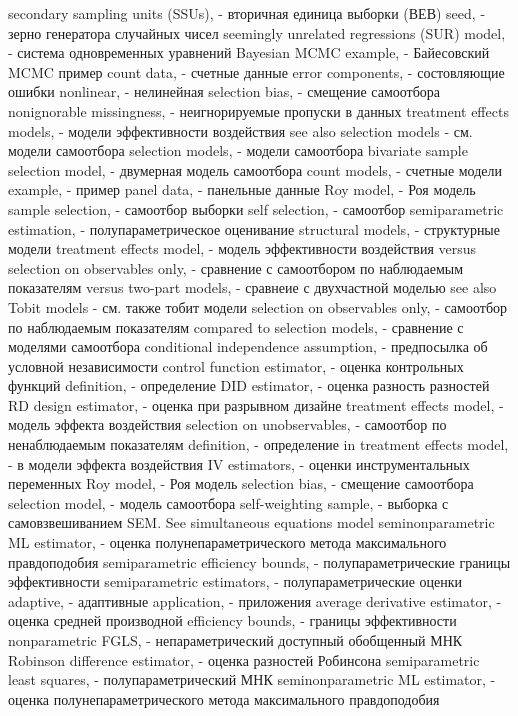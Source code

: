 secondary sampling units (SSUs), - вторичная единица выборки (ВЕВ)
seed, - зерно генератора случайных чисел
seemingly unrelated regressions (SUR) model, - система одновременных уравнений
Bayesian MCMC example, - Байесовский MCMC пример
count data, - счетные данные
error components, - состовляющие ошибки
nonlinear, - нелинейная
selection bias, - смещение самоотбора
nonignorable missingness, - неигнорируемые пропуски в данных
treatment effects models, - модели эффективности воздействия
see also selection models - см. модели самоотбора
selection models, - модели самоотбора
bivariate sample selection model, - двумерная модель самоотбора
count models, - счетные модели
example, - пример
panel data, - панельные данные
Roy model, - Роя модель
sample selection, - самоотбор выборки
self selection, - самоотбор
semiparametric estimation, - полупараметрическое оценивание
structural models, - структурные модели
treatment effects model, - модель эффективности воздействия
versus selection on observables only, - сравнение с самоотбором по наблюдаемым показателям
versus two-part models, - сравнеие с двухчастной моделью
see also Tobit models - см. также тобит модели
selection on observables only, - самоотбор по наблюдаемым показателям
compared to selection models, - сравнение с моделями самоотбора
conditional independence assumption, - предпосылка об условной независимости
control function estimator, - оценка контрольных функций
definition, - определение
DID estimator, - оценка разность разностей
RD design estimator, - оценка при разрывном дизайне
treatment effects model, - модель эффекта воздействия
selection on unobservables, - самоотбор по ненаблюдаемым показателям
definition, - определение
in treatment effects model, - в модели эффекта воздействия
IV estimators, - оценки инструментальных переменных
Roy model, - Роя модель
selection bias, - смещение самоотбора
selection model, - модель самоотбора
self-weighting sample, - выборка с самовзвешиванием
SEM. See simultaneous equations model 
seminonparametric ML estimator, - оценка полунепараметрического метода максимального правдоподобия
semiparametric efficiency bounds, - полупараметрические границы эффективности
semiparametric estimators, - полупараметрические оценки
adaptive, - адаптивные
application, - приложения
average derivative estimator, - оценка средней производной
efficiency bounds, - границы эффективности
nonparametric FGLS, - непараметрический доступный обобщенный МНК
Robinson difference estimator, - оценка разностей Робинсона
semiparametric least squares, - полупараметрический МНК
seminonparametric ML estimator, - оценка полунепараметрического метода максимального правдоподобия

